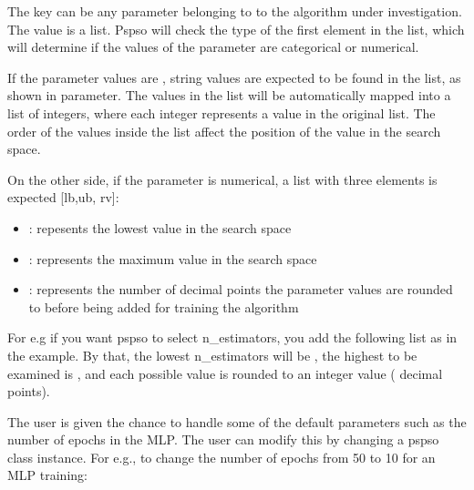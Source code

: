 \documentclass[letterpaper,10pt,english]{sphinxmanual}
\begin{document}
The key can be any parameter belonging to to the algorithm under investigation.
The value is a list.
Pspso will check the type of the first element in the list, which will determine if the values of the parameter are categorical or numerical.


If the parameter values are , string values are expected to be found in the list, as shown in  parameter.
The values in the list will be automatically mapped into a list of integers, where each integer represents a value in the original list.
The order of the values inside the list affect the position of the value in the search space.


On the other side, if the parameter is numerical, a list with three elements is expected {[}lb,ub, rv{]}:
\begin{itemize}
\item {} 
: repesents the lowest value in the search space

\item {} 
: represents the maximum value in the search space

\item {} 
: represents the number of decimal points the parameter values are rounded to before being added for training the algorithm

\end{itemize}

For e.g if you want pspso to select n\_estimators, you add the following list \sphinxstyleemphasis{{[}2,200,0{]}} as in the example.
By that, the lowest n\_estimators will be , the highest to be examined is , and each possible value is rounded to an integer value (  decimal points).


The user is given the chance to handle some of the default parameters
such as the number of epochs in the MLP. The user can modify this by changing a
pspso class instance. For e.g., to change the number of
epochs from 50 to 10 for an MLP training:
\end{document}
